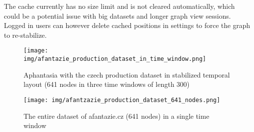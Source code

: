 The cache currently has no size limit and is not cleared automatically, which could be a potential issue with big datasets and longer graph view sessions.
Logged in users can however delete cached positions in settings to force the graph to re-stabilize.

\begin{figure}[p]
    \texttt{[image: img/afantazie\_production\_dataset\_in\_time\_window.png]}
    \caption{Aphantasia with the czech production dataset in stabilized temporal layout (641 nodes in three time windows of length 300)}
    \label{obr:afantazie_production_dataset_in_time_window}
\end{figure}

\begin{figure}[p]
    \texttt{[image: img/afantzazie\_production\_dataset\_641\_nodes.png]}
    \caption{The entire dataset of afantazie.cz (641 nodes) in a single time window}
    \label{obr:afantzazie_production_dataset_640_nodes}
\end{figure}



